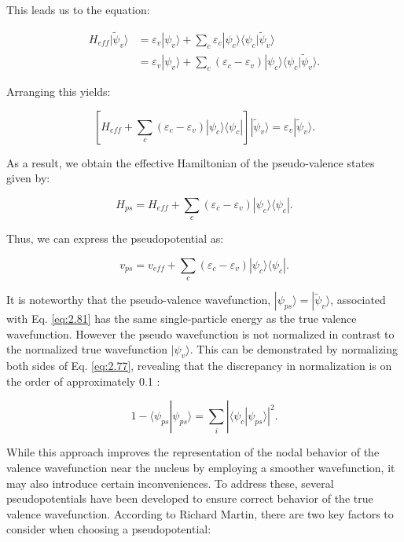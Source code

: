 This leads us to the equation:  

\begin{align}  
	H_{eff} |\tilde{\psi}_v\rangle &= \varepsilon_v |\psi_v\rangle + \sum_{c} \varepsilon_c |\psi_c\rangle \langle \psi_c | \tilde{\psi}_v\rangle \\   
	&= \varepsilon_v |\psi_v\rangle + \sum_{c} \left( \varepsilon_c - \varepsilon_v \right) |\psi_c\rangle \langle \psi_c | \tilde{\psi}_v\rangle.  
\end{align}  

Arranging this yields:  

\begin{equation}  
	\left[ H_{eff} + \sum_{c} \left( \varepsilon_c - \varepsilon_v \right) |\psi_c\rangle \langle \psi_c | \right] |\tilde{\psi}_v\rangle = \varepsilon_v |\tilde{\psi}_v\rangle.  
	\label{eq:2.81}
\end{equation}  

As a result, we obtain the effective Hamiltonian of the pseudo-valence states given by:  

\begin{equation}  
	H_{ps} = H_{eff} + \sum_{c} \left( \varepsilon_c - \varepsilon_v \right) |\psi_c\rangle \langle \psi_c |.  
\end{equation}  

Thus, we can express the pseudopotential as:  

\begin{equation}  
	v_{ps} = v_{eff} + \sum_{c} \left( \varepsilon_c - \varepsilon_v \right) |\psi_c\rangle \langle \psi_c |.  
\end{equation}  

It is noteworthy that the pseudo-valence wavefunction, $|\psi_{ps} \rangle =|\tilde{\psi}_v\rangle $, associated with Eq. \ref{eq:2.81} has the same single-particle energy as the true valence wavefunction. However the pseudo wavefunction  is not normalized in contrast to the normalized true wavefunction \( |\psi_v\rangle \). This can be demonstrated by normalizing both sides of Eq. \ref{eq:2.77}, revealing that the discrepancy in normalization is on the order of approximately 0.1 \supercite{Gross2003}:  

\begin{equation}  
	1 - \langle \psi_{ps} | \psi_{ps} \rangle = \sum_{i} |\langle \psi_{c} | \psi_{ps} \rangle|^{2}.  
\end{equation}  

While this approach improves the representation of the nodal behavior of the valence wavefunction near the nucleus by employing a smoother wavefunction, it may also introduce certain inconveniences. To address these, several pseudopotentials have been developed to ensure correct behavior of the true valence wavefunction. According to Richard Martin\supercite{martin2020electronic}, there are two key factors to consider when choosing a pseudopotential:  

